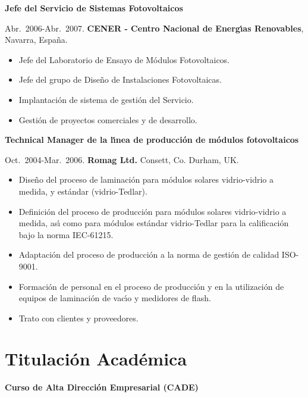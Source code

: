 \documentclass{article}
\begin{document}
{\bf Jefe del Servicio de Sistemas Fotovoltaicos}

\medskip
Abr.~2006-Abr.~2007. 
{\bf CENER - Centro Nacional de Energ\'{\i}as Renovables},
Navarra, Espa\~na.

\begin{itemize}\itemsep 0pt
\item Jefe del Laboratorio de Ensayo de M\'odulos Fotovoltaicos.
\item Jefe del grupo de Dise\~no de Instalaciones Fotovoltaicas.
\item Implantaci\'on de sistema de gesti\'on del Servicio.
\item Gesti\'on de proyectos comerciales y de desarrollo.
\end{itemize}


{\bf Technical Manager de la l\'{\i}nea de producci\'on de m\'odulos fotovoltaicos}

\medskip
Oct.~2004-Mar.~2006. 
{\bf Romag Ltd.} 
Consett, Co. Durham, UK.

\begin{itemize}\itemsep 0pt
\item Dise\~no del proceso de laminaci\'on para m\'odulos solares vidrio-vidrio a medida, y est\'andar (vidrio-Tedlar).
\item Definici\'on del proceso de producci\'on para m\'odulos solares vidrio-vidrio a medida, as\'{\i} como para m\'odulos est\'andar vidrio-Tedlar para la calificaci\'on bajo la norma IEC-61215.
\item Adaptaci\'on del proceso de producci\'on a la norma de gesti\'on de calidad ISO-9001.
\item Formaci\'on de personal en el proceso de producci\'on y en la utilizaci\'on de equipos de laminaci\'on de vac\'{\i}o y medidores de flash.
\item Trato con clientes y proveedores.
\end{itemize}


\section*{Titulaci\'{o}n Acad\'{e}mica}

{\bf Curso de Alta Direcci\'on Empresarial (CADE)}
\end{document}
